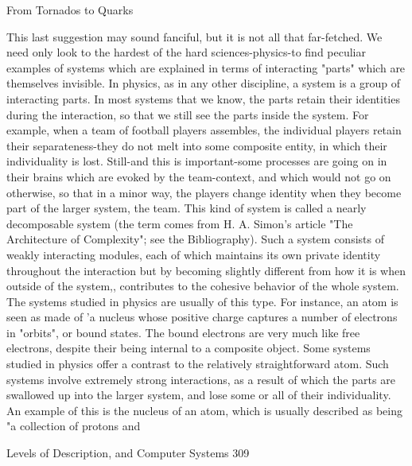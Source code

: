                                        From Tornados to Quarks

               This last suggestion may sound fanciful, but it is not all that far-fetched.
       We need only look to the hardest of the hard sciences-physics-to find peculiar
       examples of systems which are explained in terms of interacting "parts" which are
       themselves invisible. In physics, as in any other discipline, a system is a group of
       interacting parts. In most systems that we know, the parts retain their identities
       during the interaction, so that we still see the parts inside the system. For
       example, when a team of football players assembles, the individual players retain
       their separateness-they do not melt into some composite entity, in which their
       individuality is lost. Still-and this is important-some processes are going on in
       their brains which are evoked by the team-context, and which would not go on
       otherwise, so that in a minor way, the players change identity when they become
       part of the larger system, the team. This kind of system is called a nearly
       decomposable system (the term comes from H. A. Simon's article "The
       Architecture of Complexity"; see the Bibliography). Such a system consists of
       weakly interacting modules, each of which maintains its own private identity
       throughout the interaction but by becoming slightly different from how it is when
       outside of the system,, contributes to the cohesive behavior of the whole system.
       The systems studied in physics are usually of this type. For instance, an atom is
       seen as made of 'a nucleus whose positive charge captures a number of electrons
       in "orbits", or bound states. The bound electrons are very much like free electrons,
       despite their being internal to a composite object.
               Some systems studied in physics offer a contrast to the relatively
       straightforward atom. Such systems involve extremely strong interactions, as a
       result of which the parts are swallowed up into the larger system, and lose some
       or all of their individuality. An example of this is the nucleus of an atom, which is
       usually described as being "a collection of protons and



Levels of Description, and Computer Systems                                             309

